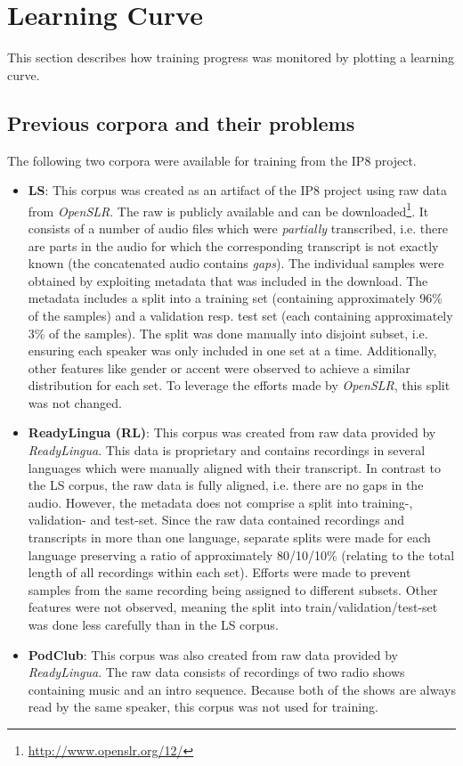 \section{Learning Curve}

This section describes how training progress was monitored by plotting a learning curve.

\subsection{Previous corpora and their problems}

The following two corpora were available for training from the IP8 project.

\begin{itemize}
	\item \textbf{\ac{LS}}: This corpus was created as an artifact of the IP8 project using raw data from \textit{OpenSLR}. The raw is publicly available and can be downloaded\footnote{\url{http://www.openslr.org/12/}}. It consists of a number of audio files which were \textit{partially} transcribed, i.e. there are parts in the audio for which the corresponding transcript is not exactly known (the concatenated audio contains \textit{gaps}). The individual samples were obtained by exploiting metadata that was included in the download. The metadata includes a split into a training set (containing approximately 96\% of the samples) and a validation resp. test set (each containing approximately 3\% of the samples). The split was done manually into disjoint subset, i.e. ensuring each speaker was only included in one set at a time. Additionally, other features like gender or accent were observed to achieve a similar distribution for each set. To leverage the efforts made by \textit{OpenSLR}, this split was not changed.
	\item \textbf{ReadyLingua (RL)}: This corpus was created from raw data provided by \textit{ReadyLingua}. This data is proprietary and contains recordings in several languages which were manually aligned with their transcript. In contrast to the \ac{LS} corpus, the raw data is fully aligned, i.e. there are no gaps in the audio. However, the metadata does not comprise a split into training-, validation- and test-set. Since the raw data contained recordings and transcripts in more than one language, separate splits were made for each language preserving a ratio of approximately 80/10/10\% (relating to the total length of all recordings within each set). Efforts were made to prevent samples from the same recording being assigned to different subsets. Other features were not observed, meaning the split into train/validation/test-set was done less carefully than in the \ac{LS} corpus.
	\item \textbf{PodClub}: This corpus was also created from raw data provided by \textit{ReadyLingua}. The raw data consists of recordings of two radio shows containing music and an intro sequence. Because both of the shows are always read by the same speaker, this corpus was not used for training.
\end{itemize}

